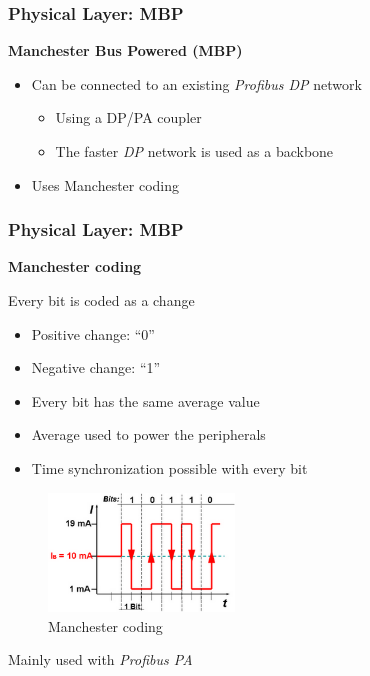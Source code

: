 \documentclass{beamer}
\begin{document}
\begin{frame}
  \frametitle{Physical Layer: MBP}
  \textbf{Manchester Bus Powered (MBP)}
  \begin{itemize}
    \item Can be connected to an existing \textit{Profibus DP} network
      \begin{itemize}
        \item Using a DP/PA coupler
        \item The faster \textit{DP} network is used as a backbone
      \end{itemize}
    \item Uses Manchester coding
  \end{itemize}
\end{frame}

\begin{frame}
  \frametitle{Physical Layer: MBP}
  \textbf{Manchester coding} \\
  \begin{itemize}
    \begin{multicols}{2}
    \item Every bit is coded as a change
      \begin{itemize}
        \item Positive change: ``0''
        \item Negative change: ``1''
        \item Every bit has the same average value
        \item Average used to power the peripherals
        \item Time synchronization possible with every bit
      \end{itemize}
      \columnbreak
      \begin{figure}[h]
        \centering
        \includegraphics[width=140pt]{img/mbp}
        \caption{Manchester coding~\cite{profibusmanual}}
        \label{fig:mbp}
      \end{figure}
    \end{multicols}
  \end{itemize}
  Mainly used with \textit{Profibus PA}
\end{frame}
\end{document}

